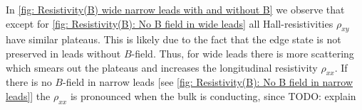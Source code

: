 \documentclass[
	secnumarabic, %
	nobibnotes, %
	aps, %
	prb, %
	floatfix, %
]{revtex4-2}
\newcommand{\todo}[1]{{\color{red}TODO: #1}}
\begin{document}
In
	\cref{fig: Resistivity(B) wide narrow leads with and without B}
	we observe that except for
	\cref{fig: Resistivity(B): No B field in wide leads}
	all Hall-resistivities $\rho_{xy}$ have similar plateaus.
This is likely due to the fact that the edge state is not preserved in leads without $B$-field.
Thus, for wide leads there is more scattering which smears out the plateaus and increases the longitudinal resistivity $\rho_{xx}$.
If there is no $B$-field in narrow leads
	[see \cref{fig: Resistivity(B): No B field in narrow leads}]
	the $\rho_{xx}$ is pronounced when the bulk is conducting, since \todo{explain}



\end{document}
